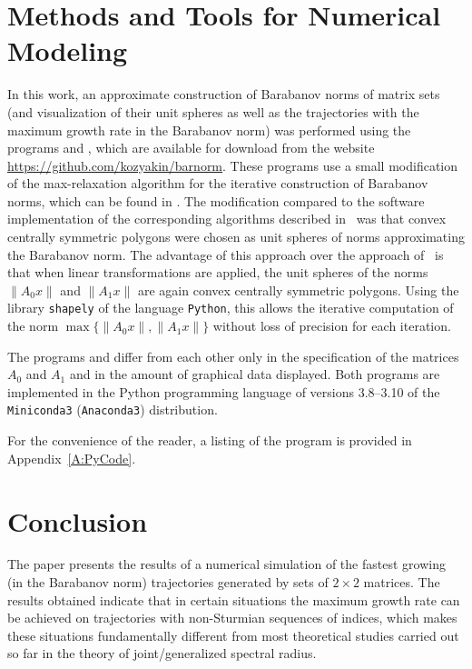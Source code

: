 \documentclass[a4paper,10pt,reqno]{amsart}
\let\cite\citep
\begin{document}
\section{Methods and Tools for Numerical Modeling}\label{S:numeric}

In this work, an approximate construction of Barabanov norms of matrix sets
(and visualization of their unit spheres as well as the trajectories with the
maximum growth rate in the Barabanov norm) was performed using the programs
\texttt{} and
\texttt{}, which are available for download from
the website \url{https://github.com/kozyakin/barnorm}. These programs use a
small modification of the max-relaxation algorithm for the iterative
construction of Barabanov norms, which can be found in \cite{Koz:DCDSB10,
Koz:JDEA11}. The modification compared to the software implementation of the
corresponding algorithms described in~\cite{Koz:ArXiv10-1} was that convex
centrally symmetric polygons were chosen as unit spheres of norms
approximating the Barabanov norm. The advantage of this approach over the
approach of~\cite{Koz:ArXiv10-1} is that when linear transformations are
applied, the unit spheres of the norms $\|A_{0}x\|$ and $\|A_{1}x\|$ are
again convex centrally symmetric polygons. Using the library \texttt{shapely}
of the language \texttt{Python}, this allows the iterative computation of the
norm $\max\{\|A_{0}x\|, \|A_{1}x\|\}$ without loss of precision for each
iteration.

The programs \texttt{} and
\texttt{} differ from each other only in the
specification of the matrices $A_{0}$ and $A_{1}$ and in the amount of
graphical data displayed. Both programs are implemented in the Python
programming language of versions 3.8--3.10 of the \texttt{Miniconda3}
(\texttt{Anaconda3}) distribution.

For the convenience of the reader, a listing of the program
\texttt{} is provided in Appendix~\ref{A:PyCode}.

\section{Conclusion}\label{S:conclusion}

The paper presents the results of a numerical simulation of the fastest
growing (in the Barabanov norm) trajectories generated by sets of
${2\times2}$ matrices. The results obtained indicate that in certain
situations the maximum growth rate can be achieved on trajectories with
non-Sturmian sequences of indices, which makes these situations fundamentally
different from most theoretical studies carried out so far in the theory of
joint/generalized spectral radius.
\end{document}
